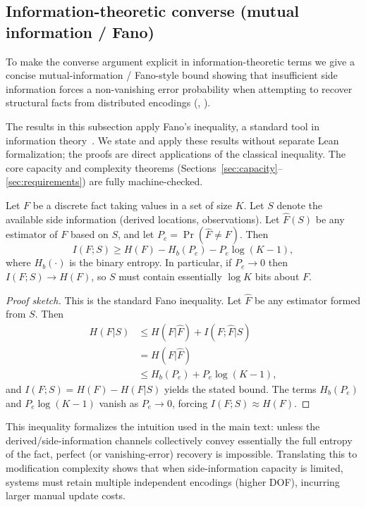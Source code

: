 \subsection{Information-theoretic converse (mutual information / Fano)}\label{sec:info-converse}

To make the converse argument explicit in information-theoretic terms we give a concise mutual-information / Fano-style bound showing that insufficient side information forces a non-vanishing error probability when attempting to recover structural facts from distributed encodings (, ).

\begin{remark}
The results in this subsection apply Fano's inequality, a standard tool in information theory~\cite{cover2006elements}. We state and apply these results without separate Lean formalization; the proofs are direct applications of the classical inequality. The core capacity and complexity theorems (Sections~\ref{sec:capacity}--\ref{sec:requirements}) are fully machine-checked.
\end{remark}

\begin{theorem}\label{thm:fano-converse}
Let $F$ be a discrete fact taking values in a set of size $K$. Let $S$ denote the available side information (derived locations, observations). Let $\hat F(S)$ be any estimator of $F$ based on $S$, and let $P_e = \Pr(\hat F \neq F)$. Then
\[
I(F;S) \ge H(F) - H_b(P_e) - P_e\log(K-1),
\]
where $H_b(\cdot)$ is the binary entropy. In particular, if $P_e\to 0$ then $I(F;S)\to H(F)$, so $S$ must contain essentially $\log K$ bits about $F$.
\end{theorem}

\begin{proof}[Proof sketch]
This is the standard Fano inequality. Let $\hat F$ be any estimator formed from $S$. Then
\[
\begin{aligned}
H(F|S)
&\le H(F|\hat F) + I(F;\hat F|S) \\
&= H(F|\hat F) \\
&\le H_b(P_e) + P_e\log(K-1),
\end{aligned}
\]
and $I(F;S)=H(F)-H(F|S)$ yields the stated bound. The terms $H_b(P_e)$ and $P_e\log(K-1)$ vanish as $P_e\to0$, forcing $I(F;S)\approx H(F)$.
\end{proof}

\noindent This inequality formalizes the intuition used in the main text: unless the derived/side-information channels collectively convey essentially the full entropy of the fact, perfect (or vanishing-error) recovery is impossible. Translating this to modification complexity shows that when side-information capacity is limited, systems must retain multiple independent encodings (higher DOF), incurring larger manual update costs.

